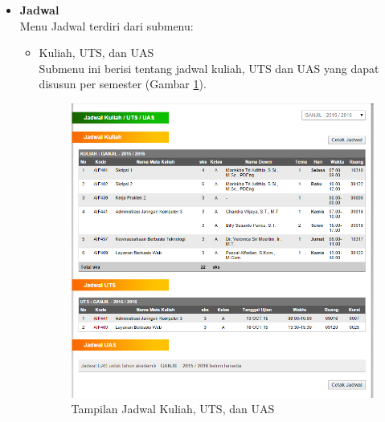 \begin{enumerate}
\begin{itemize}
		\item \textbf{ Jadwal}\\
		Menu Jadwal terdiri dari submenu: 
		\begin{itemize}
			\item Kuliah, UTS, dan UAS \\
			Submenu ini berisi tentang jadwal kuliah, UTS dan UAS yang dapat disusun per semester (Gambar \ref{fig:3_pam_utama_jadwal}). 
			\begin{figure}[H]
				\centering
				\includegraphics[scale=0.5]{Gambar/pam-utama-jadwal}
				\caption{Tampilan Jadwal Kuliah, UTS, dan UAS} 
				\label{fig:3_pam_utama_jadwal}
			\end{figure}
			

\end{itemize}
\end{itemize}
\end{enumerate}
